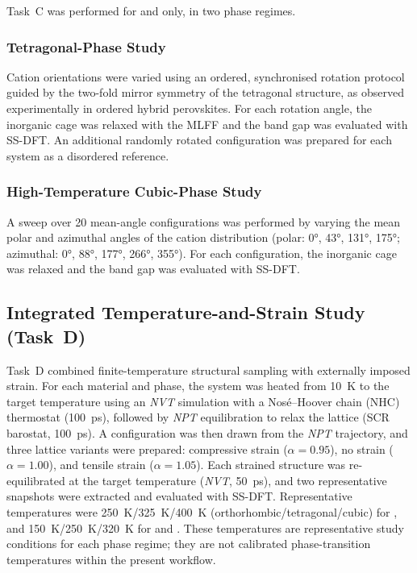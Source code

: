 Task~C was performed for \FASnI{} and \MASnI{} only,
in two phase regimes.

\subsubsection{Tetragonal-Phase Study}

Cation orientations were varied using an ordered, synchronised
rotation protocol guided by the two-fold mirror symmetry of the
tetragonal structure, as observed experimentally in ordered hybrid
perovskites.\cite{schueller2018crystal}
For each rotation angle, the inorganic cage was relaxed with the
MLFF and the band gap was evaluated with SS-DFT.
An additional randomly rotated configuration was prepared for each
system as a disordered reference.

\subsubsection{High-Temperature Cubic-Phase Study}

A sweep over 20 mean-angle configurations was performed by varying
the mean polar and azimuthal angles of the cation distribution
(polar: \ang{0}, \ang{43}, \ang{131}, \ang{175};
azimuthal: \ang{0}, \ang{88}, \ang{177}, \ang{266}, \ang{355}).
For each configuration, the inorganic cage was relaxed and the band
gap was evaluated with SS-DFT.

\subsection{Integrated Temperature-and-Strain Study (Task~D)}
\label{subsec:taskD}

Task~D combined finite-temperature structural sampling with
externally imposed strain.
For each material and phase, the system was heated from \SI{10}{K}
to the target temperature using an \textit{NVT} simulation with a
Nos\'{e}--Hoover chain (NHC) thermostat (\SI{100}{ps}), followed
by \textit{NPT} equilibration to relax the lattice (SCR barostat,
\SI{100}{ps}).
A configuration was then drawn from the \textit{NPT} trajectory,
and three lattice variants were prepared:
compressive strain ($\alpha = 0.95$), no strain ($\alpha = 1.00$),
and tensile strain ($\alpha = 1.05$).
Each strained structure was re-equilibrated at the target
temperature (\textit{NVT}, \SI{50}{ps}), and two representative
snapshots were extracted and evaluated with SS-DFT.
Representative temperatures were
\SI{250}{K}/\SI{325}{K}/\SI{400}{K}
(orthorhombic/tetragonal/cubic) for \CsSnI{}, and
\SI{150}{K}/\SI{250}{K}/\SI{320}{K} for
\FASnI{} and \MASnI{}.
These temperatures are representative study conditions for each
phase regime; they are not calibrated phase-transition temperatures
within the present workflow.